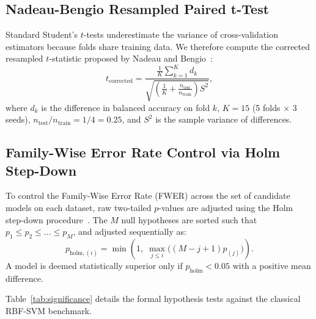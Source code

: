 \documentclass[journal,twocolumn]{IEEEtran}
\begin{document}
\subsection{Nadeau-Bengio Resampled Paired t-Test}
Standard Student's $t$-tests underestimate the variance of cross-validation estimators because folds share training data. We therefore compute the corrected resampled $t$-statistic proposed by Nadeau and Bengio~\cite{nadeau2003inference}:
\begin{equation}
t_{\text{corrected}} = \frac{\frac{1}{K} \sum_{k=1}^K d_k}{\sqrt{\left(\frac{1}{K} + \frac{n_{\text{test}}}{n_{\text{train}}}\right) S^2}},
\end{equation}
where $d_k$ is the difference in balanced accuracy on fold $k$, $K=15$ (5 folds $\times$ 3 seeds), $n_{\text{test}}/n_{\text{train}} = 1/4 = 0.25$, and $S^2$ is the sample variance of differences.

\subsection{Family-Wise Error Rate Control via Holm Step-Down}
To control the Family-Wise Error Rate (FWER) across the set of candidate models on each dataset, raw two-tailed $p$-values are adjusted using the Holm step-down procedure~\cite{holm1979simple}. The $M$ null hypotheses are sorted such that $p_1 \le p_2 \le \dots \le p_M$, and adjusted sequentially as:
\begin{equation}
p_{\text{holm}, (i)} = \min\left(1, \; \max_{j \le i} \big( (M - j + 1) p_{(j)} \big)\right).
\end{equation}
A model is deemed statistically superior only if $p_{\text{holm}} < 0.05$ with a positive mean difference.

Table~\ref{tab:significance} details the formal hypothesis tests against the classical RBF-SVM benchmark.
\end{document}
